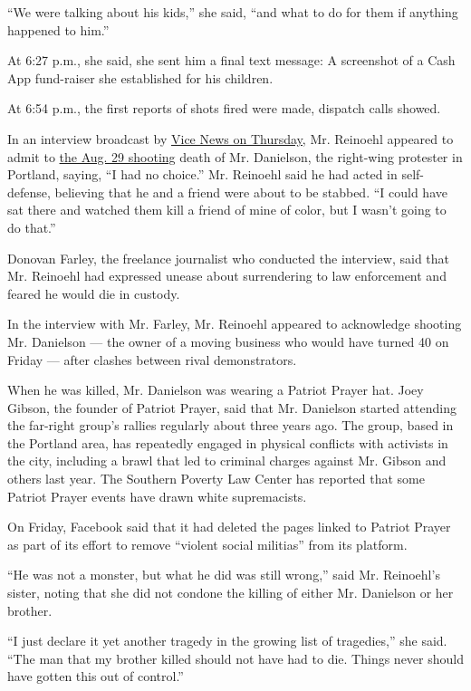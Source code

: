 ``We were talking about his kids,'' she said, ``and what to do for them
if anything happened to him.''

At 6:27 p.m., she said, she sent him a final text message: A screenshot
of a Cash App fund-raiser she established for his children.

At 6:54 p.m., the first reports of shots fired were made, dispatch calls
showed.

In an interview broadcast by
\href{https://www.vice.com/en_us/article/v7g8vb/man-linked-to-killing-at-a-portland-protest-says-he-acted-in-self-defense}{Vice
News on Thursday,} Mr. Reinoehl appeared to admit to
\href{https://www.nytimes3xbfgragh.onion/2020/08/30/us/portland-trump-rally-shooting.html}{the
Aug. 29 shooting} death of Mr. Danielson, the right-wing protester in
Portland, saying, ``I had no choice.'' Mr. Reinoehl said he had acted in
self-defense, believing that he and a friend were about to be stabbed.
``I could have sat there and watched them kill a friend of mine of
color, but I wasn't going to do that.''

Donovan Farley, the freelance journalist who conducted the interview,
said that Mr. Reinoehl had expressed unease about surrendering to law
enforcement and feared he would die in custody.

In the interview with Mr. Farley, Mr. Reinoehl appeared to acknowledge
shooting Mr. Danielson --- the owner of a moving business who would have
turned 40 on Friday --- after clashes between rival demonstrators.

When he was killed, Mr. Danielson was wearing a Patriot Prayer hat. Joey
Gibson, the founder of Patriot Prayer, said that Mr. Danielson started
attending the far-right group's rallies regularly about three years ago.
The group, based in the Portland area, has repeatedly engaged in
physical conflicts with activists in the city, including a brawl that
led to criminal charges against Mr. Gibson and others last year. The
Southern Poverty Law Center has reported that some Patriot Prayer events
have drawn white supremacists.

On Friday, Facebook said that it had deleted the pages linked to Patriot
Prayer as part of its effort to remove ``violent social militias'' from
its platform.

``He was not a monster, but what he did was still wrong,'' said Mr.
Reinoehl's sister, noting that she did not condone the killing of either
Mr. Danielson or her brother.

``I just declare it yet another tragedy in the growing list of
tragedies,'' she said. ``The man that my brother killed should not have
had to die. Things never should have gotten this out of control.''

